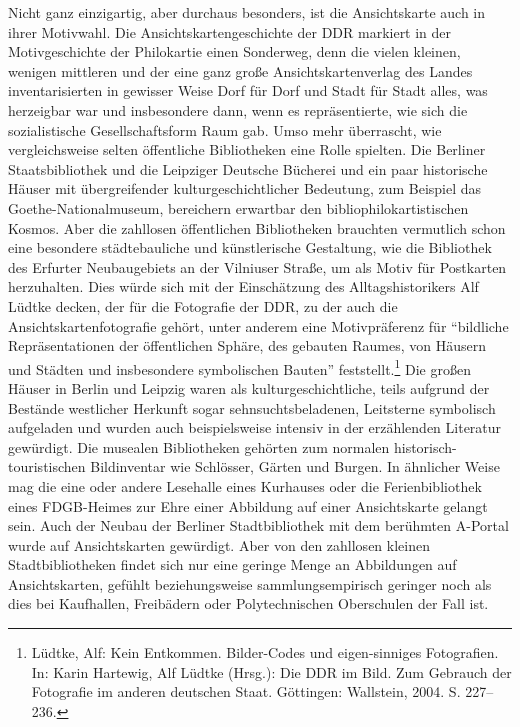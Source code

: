 \documentclass[a4paper,
fontsize=11pt,
oneside,
numbers=noperiodatend,
parskip=half-,
bibliography=totoc,
final
]{scrartcl}
\begin{document}
Nicht ganz einzigartig, aber durchaus besonders, ist die Ansichtskarte
auch in ihrer Motivwahl. Die Ansichtskartengeschichte der DDR markiert
in der Motivgeschichte der Philokartie einen Sonderweg, denn die vielen
kleinen, wenigen mittleren und der eine ganz große Ansichtskartenverlag
des Landes inventarisierten in gewisser Weise Dorf für Dorf und Stadt
für Stadt alles, was herzeigbar war und insbesondere dann, wenn es
repräsentierte, wie sich die sozialistische Gesellschaftsform Raum gab.
Umso mehr überrascht, wie vergleichsweise selten öffentliche
Bibliotheken eine Rolle spielten. Die Berliner Staatsbibliothek und die
Leipziger Deutsche Bücherei und ein paar historische Häuser mit
übergreifender kulturgeschichtlicher Bedeutung, zum Beispiel das
Goethe-Nationalmuseum, bereichern erwartbar den bibliophilokartistischen
Kosmos. Aber die zahllosen öffentlichen Bibliotheken brauchten
vermutlich schon eine besondere städtebauliche und künstlerische
Gestaltung, wie die Bibliothek des Erfurter Neubaugebiets an der
Vilniuser Straße, um als Motiv für Postkarten herzuhalten. Dies würde
sich mit der Einschätzung des Alltagshistorikers Alf Lüdtke decken, der
für die Fotografie der DDR, zu der auch die Ansichtskartenfotografie
gehört, unter anderem eine Motivpräferenz für \enquote{bildliche
Repräsentationen der öffentlichen Sphäre, des gebauten Raumes, von
Häusern und Städten und insbesondere symbolischen Bauten}
feststellt.\footnote{Lüdtke, Alf: Kein Entkommen. Bilder-Codes und
  eigen-sinniges Fotografien. In: Karin Hartewig, Alf Lüdtke (Hrsg.):
  Die DDR im Bild. Zum Gebrauch der Fotografie im anderen deutschen
  Staat. Göttingen: Wallstein, 2004. S. 227--236.} Die großen Häuser in
Berlin und Leipzig waren als kulturgeschichtliche, teils aufgrund der
Bestände westlicher Herkunft sogar sehnsuchtsbeladenen, Leitsterne
symbolisch aufgeladen und wurden auch beispielsweise intensiv in der
erzählenden Literatur gewürdigt. Die musealen Bibliotheken gehörten zum
normalen historisch-touristischen Bildinventar wie Schlösser, Gärten und
Burgen. In ähnlicher Weise mag die eine oder andere Lesehalle eines
Kurhauses oder die Ferienbibliothek eines FDGB-Heimes zur Ehre einer
Abbildung auf einer Ansichtskarte gelangt sein. Auch der Neubau der
Berliner Stadtbibliothek mit dem berühmten A-Portal wurde auf
Ansichtskarten gewürdigt. Aber von den zahllosen kleinen
Stadtbibliotheken findet sich nur eine geringe Menge an Abbildungen auf
Ansichtskarten, gefühlt beziehungsweise sammlungsempirisch geringer noch
als dies bei Kaufhallen, Freibädern oder Polytechnischen Oberschulen der
Fall ist.
\end{document}
